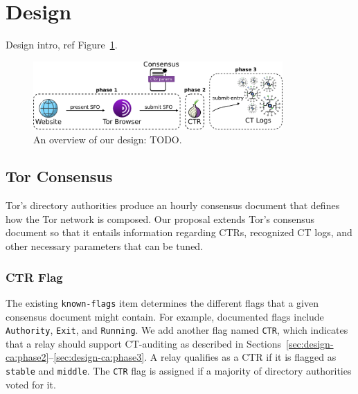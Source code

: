 \section{Design} \label{sec:design-ca}
Design intro, ref Figure~\ref{fig:design-ca}.

\begin{figure}
	\centering
	\includegraphics[width=0.85\textwidth]{img/design-ca}
	\caption{An overview of our design: TODO. }
	\label{fig:design-ca}
\end{figure}

\subsection{Tor Consensus} \label{sec:design-ca:consensus}
Tor's directory authorities produce an hourly consensus document that defines
how the Tor network is composed.  Our proposal extends Tor's consensus document
so that it entails information regarding
	CTRs,
	recognized CT logs, and
	other necessary parameters that can be tuned.

\subsubsection{CTR Flag} \label{sec:design-ca:consensus:ctr-flag}
The existing \texttt{known-flags} item determines the different flags that a 
given consensus document might contain.  For example, documented flags include
\texttt{Authority}, \texttt{Exit}, and \texttt{Running}.  We add another flag
named \texttt{CTR}, which indicates that a relay should support CT-auditing as
described in Sections~\ref{sec:design-ca:phase2}--\ref{sec:design-ca:phase3}.  A
relay qualifies as a CTR if it is flagged as \texttt{stable} and
\texttt{middle}.  The \texttt{CTR} flag is assigned if a majority of directory
authorities voted for it.


